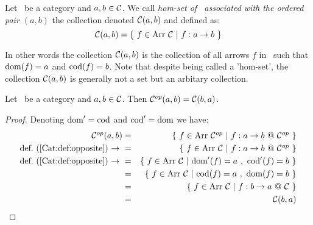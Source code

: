 \begin{defin}\label{Cat:def:homset}
    Let \Cat\ be a category and $a,b\in\mbox{$\cal C$}$. We call {\em hom-set of \Cat\ 
    associated with the ordered pair $(a,b)$} the collection denoted $\mbox{$\cal C$}(a,b)$ 
    and defined as:
        \[
            \Cat(a,b) = \{\ f\in\arr\ \Cat\ |\ f : a \to b\ \}
        \]
\end{defin}

\noindent
In other words the collection $\mbox{$\cal C$}(a,b)$ is the collection of all arrows $f$ in
\Cat\ such that $\mbox{\rm dom}(f)=a$ and $\mbox{\rm cod}(f)=b$. Note that despite being called a
'hom-set', the collection $\mbox{$\cal C$}(a,b)$ is generally not a set but an 
arbitary collection.

\begin{prop}\label{Cat:prop:homset:opposite}
    Let \Cat\ be a category and $a,b\in\mbox{$\cal C$}$. Then $\mbox{${\cal C}^{op}$}(a,b)=\mbox{$\cal C$}(b,a)$.
\end{prop}
\begin{proof}
    Denoting $\mbox{\rm dom}'=\mbox{\rm cod}$ and $\mbox{\rm cod}'=\mbox{\rm dom}$ we have:
        \begin{eqnarray*}\Cop(a,b)
            &=&\{\ f\in\arr\ \Cop\ |\ f : a \to b\ @~\Cop\ \}\\
            \mbox{def.~(\ref{Cat:def:opposite})\ $\to$\ }
            &=&\{\ f\in\arr\ \Cat\ |\ f : a \to b\ @~\Cop\ \}\\
            \mbox{def.~(\ref{Cat:def:opposite})\ $\to$\ }
            &=&\{\ f\in\arr\ \Cat\ |\ \dom'(f)=a\ ,\ \cod'(f)=b\ \}\\
            &=&\{\ f\in\arr\ \Cat\ |\ \cod(f)=a\ ,\ \dom(f)=b\ \}\\
            &=&\{\ f\in\arr\ \Cat\ |\ f : b \to a\ @~\Cat\ \}\\
            &=&\Cat(b,a)
        \end{eqnarray*}
\end{proof}

